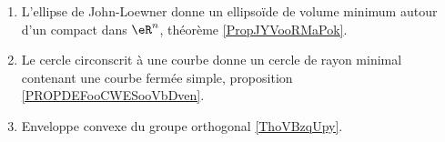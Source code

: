 
    \begin{enumerate}
        \item
            L'ellipse de John-Loewner donne un ellipsoïde de volume minimum autour d'un compact dans \( \eR^n\), théorème \ref{PropJYVooRMaPok}.
        \item
            Le cercle circonscrit à une courbe donne un cercle de rayon minimal contenant une courbe fermée simple, proposition \ref{PROPDEFooCWESooVbDven}.
    \item Enveloppe convexe du groupe orthogonal \ref{ThoVBzqUpy}.
        \end{enumerate}


